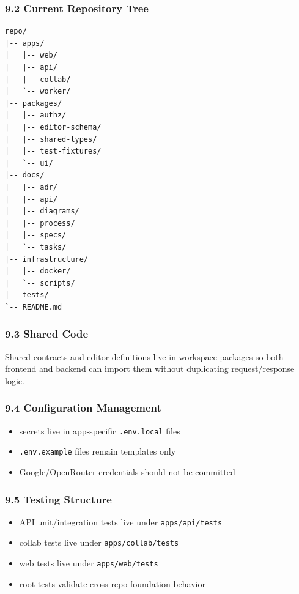 \documentclass[a4paper]{article}
\providecommand{\tightlist}{%
  \setlength{\itemsep}{0pt}\setlength{\parskip}{0pt}}
\begin{document}
\subsubsection{9.2 Current Repository
Tree}\label{92-current-repository-tree}

\begin{verbatim}
repo/
|-- apps/
|   |-- web/
|   |-- api/
|   |-- collab/
|   `-- worker/
|-- packages/
|   |-- authz/
|   |-- editor-schema/
|   |-- shared-types/
|   |-- test-fixtures/
|   `-- ui/
|-- docs/
|   |-- adr/
|   |-- api/
|   |-- diagrams/
|   |-- process/
|   |-- specs/
|   `-- tasks/
|-- infrastructure/
|   |-- docker/
|   `-- scripts/
|-- tests/
`-- README.md
\end{verbatim}

\subsubsection{9.3 Shared Code}\label{93-shared-code}

Shared contracts and editor definitions live in workspace packages so
both frontend and backend can import them without duplicating
request/response logic.

\subsubsection{9.4 Configuration
Management}\label{94-configuration-management}

\begin{itemize}
\tightlist
\item
  secrets live in app-specific \texttt{.env.local} files
\item
  \texttt{.env.example} files remain templates only
\item
  Google/OpenRouter credentials should not be committed
\end{itemize}

\subsubsection{9.5 Testing Structure}\label{95-testing-structure}

\begin{itemize}
\tightlist
\item
  API unit/integration tests live under \texttt{apps/api/tests}
\item
  collab tests live under \texttt{apps/collab/tests}
\item
  web tests live under \texttt{apps/web/tests}
\item
  root tests validate cross-repo foundation behavior
\end{itemize}
\end{document}
